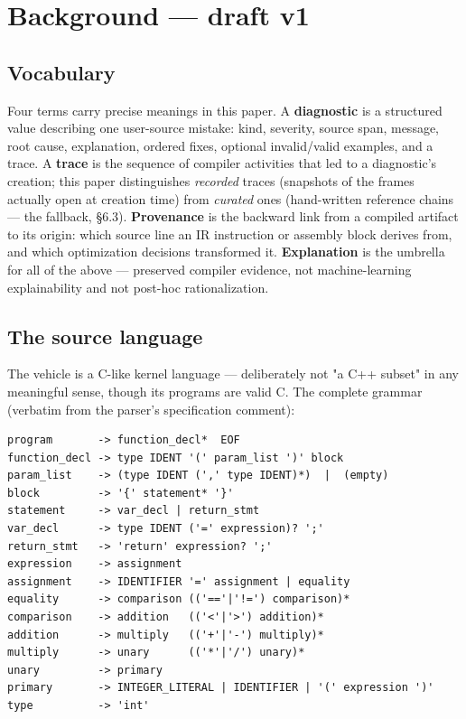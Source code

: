\section{Background --- draft v1}
\label{sec:background}

\subsection{Vocabulary}

Four terms carry precise meanings in this paper. A \textbf{diagnostic} is
a structured value describing one user-source mistake: kind,
severity, source span, message, root cause, explanation, ordered
fixes, optional invalid/valid examples, and a trace. A \textbf{trace} is
the sequence of compiler activities that led to a diagnostic's
creation; this paper distinguishes \emph{recorded} traces (snapshots of
the frames actually open at creation time) from \emph{curated} ones
(hand-written reference chains --- the fallback, \S6.3). \textbf{Provenance}
is the backward link from a compiled artifact to its origin: which
source line an IR instruction or assembly block derives from, and
which optimization decisions transformed it. \textbf{Explanation} is the
umbrella for all of the above --- preserved compiler evidence, not
machine-learning explainability and not post-hoc rationalization.

\subsection{The source language}

The vehicle is a C-like kernel language --- deliberately not "a C++
subset" in any meaningful sense, though its programs are valid C.
The complete grammar (verbatim from the parser's specification
comment):

\begin{verbatim}
program       -> function_decl*  EOF
function_decl -> type IDENT '(' param_list ')' block
param_list    -> (type IDENT (',' type IDENT)*)  |  (empty)
block         -> '{' statement* '}'
statement     -> var_decl | return_stmt
var_decl      -> type IDENT ('=' expression)? ';'
return_stmt   -> 'return' expression? ';'
expression    -> assignment
assignment    -> IDENTIFIER '=' assignment | equality
equality      -> comparison (('=='|'!=') comparison)*
comparison    -> addition   (('<'|'>') addition)*
addition      -> multiply   (('+'|'-') multiply)*
multiply      -> unary      (('*'|'/') unary)*
unary         -> primary
primary       -> INTEGER_LITERAL | IDENTIFIER | '(' expression ')'
type          -> 'int'
\end{verbatim}

